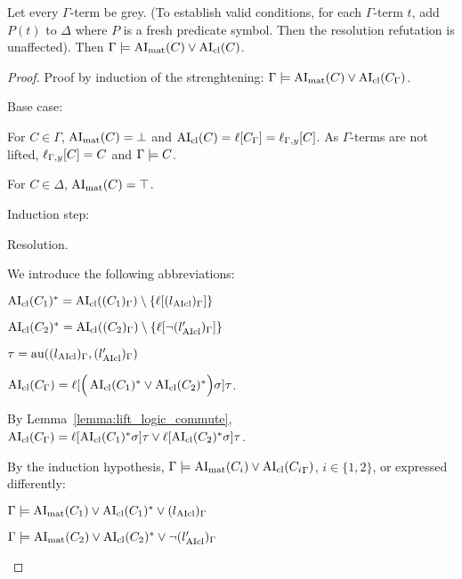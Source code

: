 \documentclass[,%
	paper=a4,%
	DIV12, %
	twoside=false,%
	liststotoc,
	bibtotoc,
	draft=false,%
	numbers=noendperiod
]{scrartcl}
\begin{document}
\begin{lemma}
	\label{ref:gamma_entails_delta_terms_lifted}
	Let every $\Gamma$-term be grey. (To establish valid conditions, for each $\Gamma$-term $t$, add $P(t)$ to $\Delta$ where $P$ is a fresh predicate symbol. Then the resolution refutation is unaffected).
	Then
	$\Gamma \models \operatorname{AI}_\mathrm{mat}(C) \lor \operatorname{AI}_\mathrm{cl}(C)$.
\end{lemma}
\begin{proof}
	Proof by induction of the strenghtening:
	$\Gamma \models \operatorname{AI}_\mathrm{mat}(C) \lor \operatorname{AI}_\mathrm{cl}(C_\Gamma)$.

	Base case:

	For $C \in \Gamma$, $\operatorname{AI}_\mathrm{mat}(C) = \bot$ and $\operatorname{AI}_\mathrm{cl}(C) = \ell[C_\Gamma] = \ell_{\Gamma,y}[C]$. As $\Gamma$-terms are not lifted, $\ell_{\Gamma,y}[C] = C$ and $\Gamma \models C$.

	For $C \in \Delta$, $\operatorname{AI}_\mathrm{mat}(C) = \top$.

	Induction step:


	\begin{description}
		\item{Resolution.}
			\begin{prooftree}
			\end{prooftree}
			We introduce the following abbreviations:

			$ \operatorname{AI}_\mathrm{cl}(C_1)^* = \operatorname{AI}_\mathrm{cl}((C_1)_\Gamma) \setminus \{\ell[(l{_{\operatorname{AIcl}}})_\Gamma]\}$

			$ \operatorname{AI}_\mathrm{cl}(C_2)^* = \operatorname{AI}_\mathrm{cl}((C_2)_\Gamma)\setminus \{\ell[\lnot (l{_{\operatorname{AIcl}}'})_\Gamma]\}$

			$\tau  = \operatorname{au}((l{_{\operatorname{AIcl}}})_\Gamma, (l{_{\operatorname{AIcl}}'})_\Gamma)$

			$\operatorname{AI}_\mathrm{cl}(C_\Gamma) =
			\ell[\Big( \operatorname{AI}_\mathrm{cl}(C_1)^* \lor \operatorname{AI}_\mathrm{cl}(C_2)^* \Big)\sigma] \tau$.

			By Lemma~\ref{lemma:lift_logic_commute},
			$\operatorname{AI}_\mathrm{cl}(C_\Gamma) =
			\ell[\operatorname{AI}_\mathrm{cl}(C_1)^*\sigma]\tau \lor \ell[\operatorname{AI}_\mathrm{cl}(C_2)^*\sigma] \tau$.

			By the induction hypothesis,
			$\Gamma \models \operatorname{AI}_\mathrm{mat}(C_i) \lor \operatorname{AI}_\mathrm{cl}({C_i}_\Gamma)$, $i\in\{1,2\}$, or expressed differently:


			$\Gamma \models \operatorname{AI}_\mathrm{mat}(C_1) \lor \operatorname{AI}_\mathrm{cl}(C_1)^* \lor {(l{\ensuremath{_{\operatorname{AIcl}}}})_\Gamma}$

			$\Gamma \models \operatorname{AI}_\mathrm{mat}(C_2) \lor \operatorname{AI}_\mathrm{cl}(C_2)^* \lor {\lnot (l{\ensuremath{_{\operatorname{AIcl}}}'})_\Gamma}$


\end{description}
\end{proof}
\end{document}
